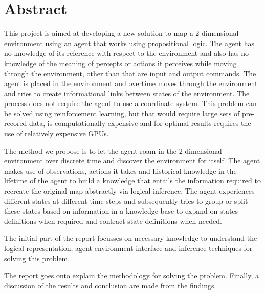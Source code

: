 \chapter{Abstract}

%
%

This project is aimed at developing a new solution to map a 2-dimensional environment using an agent that works using propositional logic. The agent has no knowledge of its reference with respect to the environment and also has no knowledge of the meaning of percepts or actions it perceives while moving through the environment, other than that are input and output commands.  The agent is placed in the environment and overtime moves through the environment and tries to create informational links between states of the environment. 
The process does not require the agent to use a coordinate system. This problem can be solved using reinforcement learning, but that would require large sets of pre-recored data, is computationally expensive and for optimal results requires the use of relatively expensive GPUs.

The method we propose is to let the agent roam in the 2-dimensional environment over discrete time and discover the environment for itself.
The agent makes use of observations, actions it takes and historical knowledge in the lifetime of the agent to build a knowledge that entails the information required to recreate the original map abstractly via logical inference. 
The agent experiences different states at different time steps and subsequently tries to group or split these states based on information in a knowledge base to expand on states definitions when required and contract state definitions when needed.


The initial part of the report focusses on necessary knowledge to understand the logical representation, agent-environment interface and inference techniques for solving this problem. 

The report goes onto explain the methodology for solving the problem.
Finally, a discussion of the results and conclusion are made from the findings.

